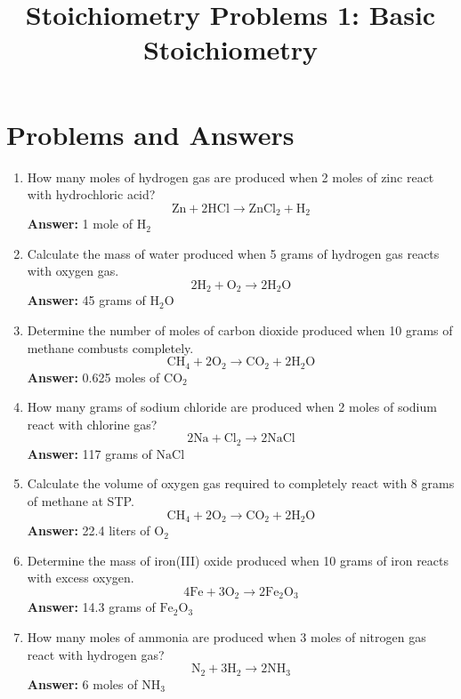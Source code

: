 \documentclass{article}
\title{Stoichiometry Problems 1: Basic Stoichiometry}
\author{}
\date{}
\begin{document}
\maketitle

\section*{Problems and Answers}

\begin{enumerate}
    \item How many moles of hydrogen gas are produced when 2 moles of zinc react with hydrochloric acid?
    \[
    \text{Zn} + 2\text{HCl} \rightarrow \text{ZnCl}_2 + \text{H}_2
    \]
    \textbf{Answer:} 1 mole of \(\text{H}_2\)

    \item Calculate the mass of water produced when 5 grams of hydrogen gas reacts with oxygen gas.
    \[
    2\text{H}_2 + \text{O}_2 \rightarrow 2\text{H}_2\text{O}
    \]
    \textbf{Answer:} 45 grams of \(\text{H}_2\text{O}\)

    \item Determine the number of moles of carbon dioxide produced when 10 grams of methane combusts completely.
    \[
    \text{CH}_4 + 2\text{O}_2 \rightarrow \text{CO}_2 + 2\text{H}_2\text{O}
    \]
    \textbf{Answer:} 0.625 moles of \(\text{CO}_2\)

    \item How many grams of sodium chloride are produced when 2 moles of sodium react with chlorine gas?
    \[
    2\text{Na} + \text{Cl}_2 \rightarrow 2\text{NaCl}
    \]
    \textbf{Answer:} 117 grams of \(\text{NaCl}\)

    \item Calculate the volume of oxygen gas required to completely react with 8 grams of methane at STP.
    \[
    \text{CH}_4 + 2\text{O}_2 \rightarrow \text{CO}_2 + 2\text{H}_2\text{O}
    \]
    \textbf{Answer:} 22.4 liters of \(\text{O}_2\)

    \item Determine the mass of iron(III) oxide produced when 10 grams of iron reacts with excess oxygen.
    \[
    4\text{Fe} + 3\text{O}_2 \rightarrow 2\text{Fe}_2\text{O}_3
    \]
    \textbf{Answer:} 14.3 grams of \(\text{Fe}_2\text{O}_3\)

    \item How many moles of ammonia are produced when 3 moles of nitrogen gas react with hydrogen gas?
    \[
    \text{N}_2 + 3\text{H}_2 \rightarrow 2\text{NH}_3
    \]
    \textbf{Answer:} 6 moles of \(\text{NH}_3\)


\end{enumerate}
\end{document}
